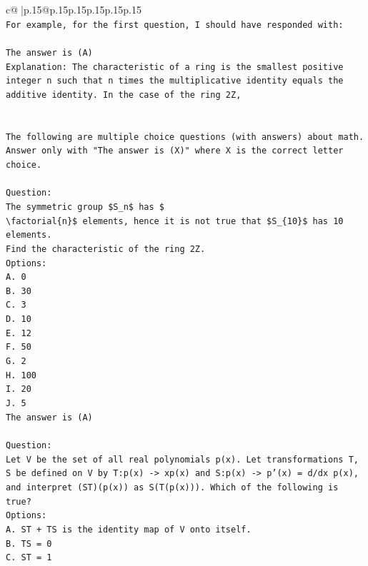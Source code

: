 \documentclass{article}
\begin{document}
{\begin{supertabular}{c@{$\;$}|p{.15\linewidth}@{}p{.15\linewidth}p{.15\linewidth}p{.15\linewidth}p{.15\linewidth}p{.15\linewidth}}
{{{\\ 
\texttt{For example, for the first question, I should have responded with:} \\
\\ 
\texttt{The answer is (A)} \\
\texttt{Explanation: The characteristic of a ring is the smallest positive integer n such that n times the multiplicative identity equals the additive identity. In the case of the ring 2Z,} \\
\\ 
\\ 
\texttt{The following are multiple choice questions (with answers) about math. Answer only with "The answer is (X)" where X is the correct letter choice.} \\
\\ 
\texttt{Question:} \\
\texttt{The symmetric group \$S\_n\$ has \$} \\
\texttt{\textbackslash{}factorial\{n\}\$ elements, hence it is not true that \$S\_\{10\}\$ has 10 elements.} \\
\texttt{Find the characteristic of the ring 2Z.} \\
\texttt{Options:} \\
\texttt{A. 0} \\
\texttt{B. 30} \\
\texttt{C. 3} \\
\texttt{D. 10} \\
\texttt{E. 12} \\
\texttt{F. 50} \\
\texttt{G. 2} \\
\texttt{H. 100} \\
\texttt{I. 20} \\
\texttt{J. 5} \\
\texttt{The answer is (A)} \\
\\ 
\texttt{Question:} \\
\texttt{Let V be the set of all real polynomials p(x). Let transformations T, S be defined on V by T:p(x) {-}> xp(x) and S:p(x) {-}> p'(x) = d/dx p(x), and interpret (ST)(p(x)) as S(T(p(x))). Which of the following is true?} \\
\texttt{Options:} \\
\texttt{A. ST + TS is the identity map of V onto itself.} \\
\texttt{B. TS = 0} \\
\texttt{C. ST = 1} \\
}}}
\end{supertabular}}
\end{document}
